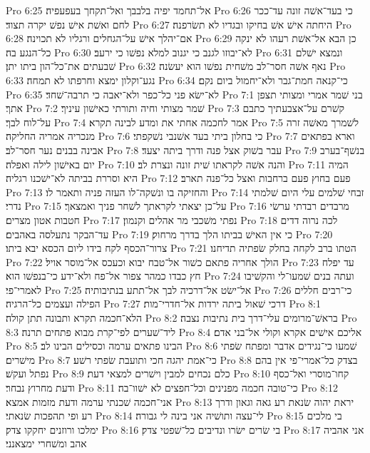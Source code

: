 Pro 6:25  אל־תחמד יפיה בלבבך ואל־תקחך בעפעפיה׃
Pro 6:26  כי בעד־אשׁה זונה עד־ככר לחם ואשׁת אישׁ נפשׁ יקרה תצוד׃
Pro 6:27  היחתה אישׁ אשׁ בחיקו ובגדיו לא תשׂרפנה׃
Pro 6:28  אם־יהלך אישׁ על־הגחלים ורגליו לא תכוינה׃
Pro 6:29  כן הבא אל־אשׁת רעהו לא ינקה כל־הנגע בה׃
Pro 6:30  לא־יבוזו לגנב כי יגנוב למלא נפשׁו כי ירעב׃
Pro 6:31  ונמצא ישׁלם שׁבעתים את־כל־הון ביתו יתן׃
Pro 6:32  נאף אשׁה חסר־לב משׁחית נפשׁו הוא יעשׂנה׃
Pro 6:33  נגע־וקלון ימצא וחרפתו לא תמחה׃
Pro 6:34  כי־קנאה חמת־גבר ולא־יחמול ביום נקם׃
Pro 6:35  לא־ישׂא פני כל־כפר ולא־יאבה כי תרבה־שׁחד׃
Pro 7:1  בני שׁמר אמרי ומצותי תצפן אתך׃
Pro 7:2  שׁמר מצותי וחיה ותורתי כאישׁון עיניך׃
Pro 7:3  קשׁרם על־אצבעתיך כתבם על־לוח לבך׃
Pro 7:4  אמר לחכמה אחתי את ומדע לבינה תקרא׃
Pro 7:5  לשׁמרך מאשׁה זרה מנכריה אמריה החליקה׃
Pro 7:6  כי בחלון ביתי בעד אשׁנבי נשׁקפתי׃
Pro 7:7  וארא בפתאים אבינה בבנים נער חסר־לב׃
Pro 7:8  עבר בשׁוק אצל פנה ודרך ביתה יצעד׃
Pro 7:9  בנשׁף־בערב יום באישׁון לילה ואפלה׃
Pro 7:10  והנה אשׁה לקראתו שׁית זונה ונצרת לב׃
Pro 7:11  המיה היא וסררת בביתה לא־ישׁכנו רגליה׃
Pro 7:12  פעם בחוץ פעם ברחבות ואצל כל־פנה תארב׃
Pro 7:13  והחזיקה בו ונשׁקה־לו העזה פניה ותאמר לו׃
Pro 7:14  זבחי שׁלמים עלי היום שׁלמתי נדרי׃
Pro 7:15  על־כן יצאתי לקראתך לשׁחר פניך ואמצאך׃
Pro 7:16  מרבדים רבדתי ערשׂי חטבות אטון מצרים׃
Pro 7:17  נפתי משׁכבי מר אהלים וקנמון׃
Pro 7:18  לכה נרוה דדים עד־הבקר נתעלסה באהבים׃
Pro 7:19  כי אין האישׁ בביתו הלך בדרך מרחוק׃
Pro 7:20  צרור־הכסף לקח בידו ליום הכסא יבא ביתו׃
Pro 7:21  הטתו ברב לקחה בחלק שׂפתיה תדיחנו׃
Pro 7:22  הולך אחריה פתאם כשׁור אל־טבח יבוא וכעכס אל־מוסר אויל׃
Pro 7:23  עד יפלח חץ כבדו כמהר צפור אל־פח ולא־ידע כי־בנפשׁו הוא׃
Pro 7:24  ועתה בנים שׁמעו־לי והקשׁיבו לאמרי־פי׃
Pro 7:25  אל־ישׂט אל־דרכיה לבך אל־תתע בנתיבותיה׃
Pro 7:26  כי־רבים חללים הפילה ועצמים כל־הרגיה׃
Pro 7:27  דרכי שׁאול ביתה ירדות אל־חדרי־מות׃
Pro 8:1  הלא־חכמה תקרא ותבונה תתן קולה׃
Pro 8:2  בראשׁ־מרומים עלי־דרך בית נתיבות נצבה׃
Pro 8:3  ליד־שׁערים לפי־קרת מבוא פתחים תרנה׃
Pro 8:4  אליכם אישׁים אקרא וקולי אל־בני אדם׃
Pro 8:5  הבינו פתאים ערמה וכסילים הבינו לב׃
Pro 8:6  שׁמעו כי־נגידים אדבר ומפתח שׂפתי מישׁרים׃
Pro 8:7  כי־אמת יהגה חכי ותועבת שׂפתי רשׁע׃
Pro 8:8  בצדק כל־אמרי־פי אין בהם נפתל ועקשׁ׃
Pro 8:9  כלם נכחים למבין וישׁרים למצאי דעת׃
Pro 8:10  קחו־מוסרי ואל־כסף ודעת מחרוץ נבחר׃
Pro 8:11  כי־טובה חכמה מפנינים וכל־חפצים לא ישׁוו־בה׃
Pro 8:12  אני־חכמה שׁכנתי ערמה ודעת מזמות אמצא׃
Pro 8:13  יראת יהוה שׂנאת רע גאה וגאון ודרך רע ופי תהפכות שׂנאתי׃
Pro 8:14  לי־עצה ותושׁיה אני בינה לי גבורה׃
Pro 8:15  בי מלכים ימלכו ורוזנים יחקקו צדק׃
Pro 8:16  בי שׂרים ישׂרו ונדיבים כל־שׁפטי צדק׃
Pro 8:17  אני אהביה אהב ומשׁחרי ימצאנני׃
